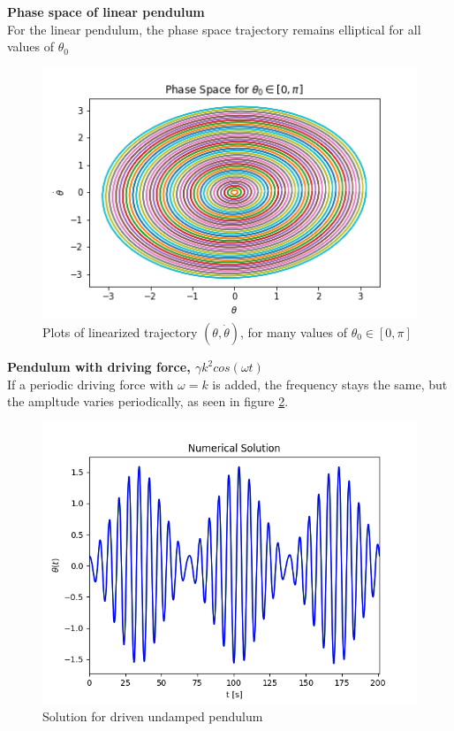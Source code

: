 \documentclass[12pt]{article}
\newenvironment{problem}[2][]{\begin{trivlist}
\item[\hskip \labelsep {\bfseries #1}\hskip \labelsep {\bfseries #2.}]}{\end{trivlist}}
\begin{document}
\begin{problem}{2}
	\textbf{Phase space of linear pendulum} \\
	For the linear pendulum, the phase space trajectory remains elliptical for all values of $\theta_{0}$

\begin{figure}[h!]
\centering
  \includegraphics[scale=0.6]{../figures/phaseSpaceLinear.png}
  \caption{Plots of linearized trajectory $(\theta,\dot{\theta})$, for many values of $\theta_{0} \in [0,\pi]$}
  \label{phaseLin}
\end{figure}
\end{problem}

\begin{problem}{3}
	\textbf{Pendulum with driving force, $\gamma k^{2}cos(\omega t)$} \\
	If a periodic driving force with $\omega = k$ is added, the frequency stays the same, but the ampltude varies periodically, as seen in figure \ref{driving}. 
\begin{figure}[h!]
	\centering
  	\includegraphics[scale=0.6]{../figures/drivingForce.png}
 	\caption{Solution for driven undamped pendulum}
  	\label{driving}
\end{figure}
\end{problem}
\end{document}
